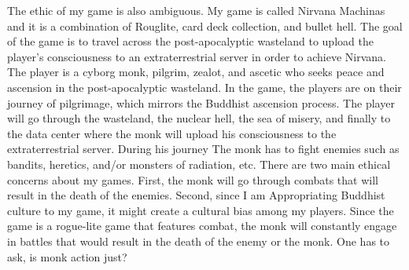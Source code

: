 \documentclass[10pt,twocolumn]{article}
\begin{document}
The ethic of my game is also ambiguous. My game is called Nirvana Machinas and it is a combination of Rouglite, card deck collection, and bullet hell. The goal of the game is to travel across the post-apocalyptic wasteland to upload the player’s consciousness to an extraterrestrial server in order to achieve Nirvana.  The player is a cyborg monk, pilgrim, zealot, and ascetic who seeks peace and ascension in the post-apocalyptic wasteland.  In the game, the players are on their journey of pilgrimage, which mirrors the Buddhist ascension process.  The player will go through the wasteland, the nuclear hell, the sea of misery, and finally to the data center where the monk will upload his consciousness to the extraterrestrial server. During his journey 
The monk has to fight enemies such as bandits, heretics, and/or monsters of radiation, etc. 
There are two main ethical concerns about my games. First, the monk will go through combats that will result in the death of the enemies. Second, since I am Appropriating Buddhist culture to my game, it might create a cultural bias among my players. 
Since the game is a rogue-lite game that features combat, the monk will constantly engage in battles that would result in the death of the enemy or the monk. One has to ask, is monk action just? 
\end{document}
